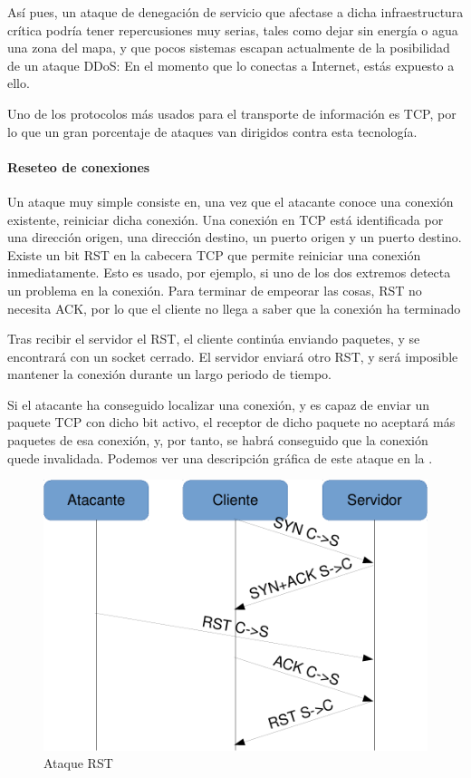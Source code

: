 Así pues, un ataque de denegación de servicio que afectase a dicha infraestructura crítica podría tener repercusiones 
muy serias, tales como dejar sin energía o agua una zona del mapa, y que pocos sistemas escapan actualmente de la 
posibilidad de un ataque \gls{DDoS}: En el momento que lo conectas a Internet, estás expuesto a ello.

Uno de los protocolos más usados para el transporte de información es \gls{TCP}, por lo que un gran porcentaje de 
ataques van dirigidos contra esta tecnología.

\paragraph{Reseteo de conexiones}\mbox{\newline}

Un ataque muy simple consiste en, una vez que el atacante conoce una conexión existente, reiniciar dicha conexión. Una 
conexión en \gls{TCP} está identificada por una dirección origen, una dirección destino, un puerto origen y un puerto 
destino. Existe un bit RST en la cabecera \gls{TCP} que permite reiniciar una conexión inmediatamente. 
Esto es usado, por ejemplo, si uno de los dos extremos detecta un problema en la conexión. Para terminar de empeorar 
las cosas, RST no necesita \gls{ACK}, por lo que el cliente no llega a saber que la conexión ha terminado

Tras recibir el servidor el RST, el cliente continúa enviando paquetes, y se encontrará con un socket cerrado. El 
servidor enviará otro RST, y será imposible mantener la conexión durante un largo periodo de tiempo. 

Si el atacante ha conseguido localizar una conexión, y es capaz de enviar un paquete \gls{TCP} con dicho bit activo, el 
receptor de dicho paquete no aceptará más paquetes de esa conexión, y, por tanto, se habrá conseguido que la conexión 
quede invalidada. Podemos ver una descripción gráfica de este ataque en la .

\begin{figure}[htbp]
\centering
\includegraphics[width=.8\textwidth]{CapituloDDoS/Figuras/RST_attack}
\caption{Ataque RST}
\end{figure}
%

